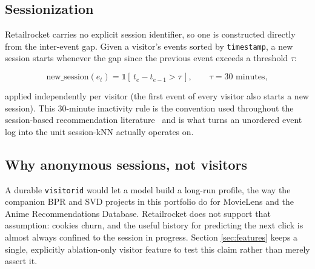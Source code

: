 \subsection{Sessionization}
\label{sec:sessionization}

Retailrocket carries no explicit session identifier, so one is constructed
directly from the inter-event gap. Given a visitor's events sorted by
\texttt{timestamp}, a new session starts whenever the gap since the previous
event exceeds a threshold $\tau$:

\begin{equation}
  \text{new\_session}(e_t) = \mathbb{1}\!\left[\, t_{e} - t_{e-1} > \tau \,\right],
  \qquad \tau = 30\text{ minutes},
  \label{eq:sessionization}
\end{equation}

applied independently per visitor (the first event of every visitor also
starts a new session). This $30$-minute inactivity rule is the convention
used throughout the session-based recommendation
literature~\cite{jannach2017knn,ludewig2018evaluation} and is what turns an
unordered event log into the unit session-kNN actually operates on.

\subsection{Why anonymous sessions, not visitors}

A durable \texttt{visitorid} would let a model build a long-run profile, the
way the companion BPR and SVD projects in this portfolio do for MovieLens and
the Anime Recommendations Database. Retailrocket does not support that
assumption: cookies churn, and the useful history for predicting the next
click is almost always confined to the session in progress. Section
\ref{sec:features} keeps a single, explicitly ablation-only visitor feature
to test this claim rather than merely assert it.
